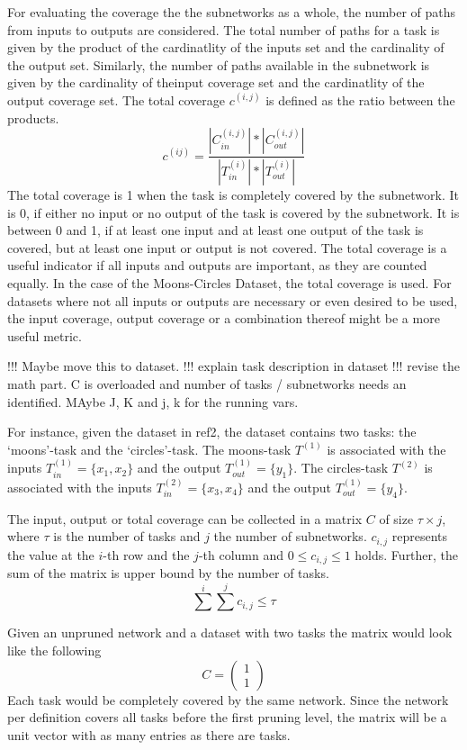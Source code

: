 For evaluating the coverage the the subnetworks as a whole, the number of paths from inputs to outputs are considered.
The total number of paths for a task is given by the product of the cardinatlity of the inputs set and the cardinality of the output set.
Similarly, the number of paths available in the subnetwork is given by the cardinality of theinput coverage set and the cardinatlity of the output coverage set.
The total coverage $c^{(i,j)}$ is defined as the ratio between the products.
$$
c^{(ij)} = \frac{
    | C^{(i,j)}_{in}| * | C^{(i,j)}_{out} |
    }{
    |T^{(i)}_{in}| * |T^{(i)}_{out}|
}
$$
The total coverage is 1 when the task is completely covered by the subnetwork.
It is 0, if either no input or no output of the task is covered by the subnetwork.
It is between 0 and 1, if at least one input and at least one output of the task is covered, but at least one input or output is not covered.
The total coverage is a useful indicator if all inputs and outputs are important, as they are counted equally.
In the case of the Moons-Circles Dataset, the total coverage is used.
For datasets where not all inputs or outputs are necessary or even desired to be used, the input coverage, output coverage or a combination thereof might be a more useful metric.

!!! Maybe move this to dataset.
!!! explain task description in dataset
!!! revise the math part. C is overloaded and number of tasks / subnetworks needs an identified. MAybe J, K and j, k for the running vars.

For instance, given the dataset in ref2, the dataset contains two tasks: the `moons'-task and the `circles'-task. 
The moons-task $T^{(1)}$ is associated with the inputs $T^{(1)}_{in} = \{x_1,x_2\}$ and the output $T^{(1)}_{out} = \{y_1\}$.
The circles-task $T^{(2)}$ is associated with the inputs $T^{(2)}_{in} = \{x_3,x_4\}$ and the output $T^{(1)}_{out} = \{y_4\}$.

The input, output or total coverage can be collected in a matrix $C$ of size $\tau \times j$, where $\tau$ is the number of tasks and $j$ the number of subnetworks. 
$c_{i,j}$ represents the value at the $i$-th row and the $j$-th column and $0 \leq c_{i,j} \leq 1$ holds.
Further, the sum of the matrix is upper bound by the number of tasks.
$$
\sum^{i} \sum^{j} c_{i,j} \leq \tau
$$


Given an unpruned network and a dataset with two tasks the matrix would look like the following 
$$
C = \begin{pmatrix}
    1 \\ 1
\end{pmatrix}
$$
Each task would be completely covered by the same network.
Since the network per definition covers all tasks before the first pruning level, the matrix will be a unit vector with as many entries as there are tasks.

